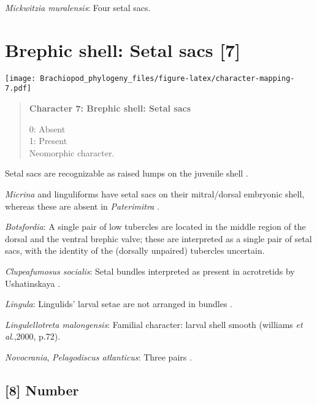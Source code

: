 \documentclass[openany]{book}
\theoremstyle{definition}
\theoremstyle{definition}
\theoremstyle{definition}
\theoremstyle{remark}
\begin{document}
\hypertarget{Mickwitzia_muralensis-coding-6}{}
\emph{Mickwitzia muralensis}: Four setal sacs.

\section{Brephic shell: Setal sacs
{[}7{]}}\label{brephic-shell-setal-sacs-7}

\texttt{[image: Brachiopod\_phylogeny\_files/figure-latex/character-mapping-7.pdf]}

\begin{quote}
\textbf{Character 7: Brephic shell: Setal sacs}

0: Absent\\
1: Present\\
Neomorphic character.
\end{quote}

Setal sacs are recognizable as raised lumps on the juvenile shell
\citep[see][]{Bassett2017Earliestontogeny}.

\emph{Micrina} and linguliforms have setal sacs on their mitral/dorsal
embryonic shell, whereas these are absent in \emph{Paterimitra}
\citep{Holmer2011Firstrecord}.

\hypertarget{Botsfordia-coding-7}{}
\emph{Botsfordia}: A single pair of low tubercles are \citep[ state
``may be'']{Ushatinskaya2016Revisionof} located in the middle region of
the dorsal and the ventral brephic valve; these are interpreted as a
single pair of setal sacs, with the identity of the (dorsally unpaired)
tubercles uncertain.

\hypertarget{Clupeafumosus_socialis-coding-7}{}
\emph{Clupeafumosus socialis}: Setal bundles interpreted as present in
acrotretids by Ushatinskaya \citeyearpar{Ushatinskaya2016Protegulumand}.

\hypertarget{Lingula-coding-7}{}
\emph{Lingula}: Lingulids' larval setae are not arranged in bundles
\citep{Carlson1995Phylogeneticrelationships}.

\hypertarget{Lingulellotreta_malongensis-coding-7}{}
\emph{Lingulellotreta malongensis}: Familial character: larval shell
smooth (williams \emph{et al}.,2000, p.72).

\hypertarget{Novocrania-coding-7}{}
\emph{Novocrania}, \emph{Pelagodiscus atlanticus}: Three pairs
\citep{Carlson1995Phylogeneticrelationships}.

\subsection*{{[}8{]} Number}\label{number}
\end{document}
